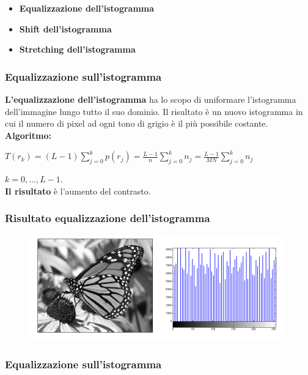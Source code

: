 \begin{itemize}
    \item \textbf{Equalizzazione dell'istogramma}
    \item \textbf{Shift dell'istogramma}
    \item \textbf{Stretching dell'istogramma}
\end{itemize}

\subsubsection{Equalizzazione sull'istogramma}

\textbf{L'equalizzazione dell'istogramma} ha lo scopo di uniformare l'istogramma dell'immagine lungo tutto il suo dominio. Il risultato
è un nuovo istogramma in cui il numero di pixel ad ogni tono di grigio è il più possibile costante.
\\\textbf{Algoritmo:}

\begin{center}
    $T(r_k) = (L-1)\sum_{j=0}^{k}p(r_j)=\frac{L-1}{n} \sum_{j=0}^{k}n_j = \frac{L-1}{MN}\sum_{j=0}^{k}n_j$
\end{center}

$k=0,...,L-1$.
\\\textbf{Il risultato} è l'aumento del contrasto.

\subsubsection{Risultato equalizzazione dell'istogramma}

\begin{figure}[H]
    \centering
    \includegraphics[width=\linewidth, keepaspectratio]{capitoli/immagini/imgs/eq-istogramma.png}
\end{figure}

\subsubsection{Equalizzazione sull'istogramma}

